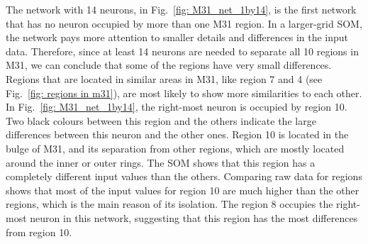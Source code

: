         
        
        The network with 14 neurons, in Fig.~\ref{fig: M31_net_1by14}, is the first network that has no neuron occupied by more than one M31 region.
        In a larger-grid SOM, the network pays more attention to smaller details and differences in the input data.
        Therefore, since at least 14 neurons are needed to separate all 10 regions in M31, we can conclude that some of the regions have very small differences.
        Regions that are located in similar areas in M31, like region 7 and 4 (see Fig.~\ref{fig: regions in m31}), are most likely to show more similarities to each other.
        In Fig.~\ref{fig: M31_net_1by14}, the right-most neuron is occupied by region 10.
        Two black colours between this region and the others indicate the large differences between this neuron and the other ones.
       Region 10 is located in the bulge of M31, and its separation from other regions, which are mostly located around the inner or outer rings.
       The SOM shows that this region has a completely different input values than the others.
       Comparing raw data for regions shows that most of the input values for region 10 are much higher than the other regions, which is the main reason of its isolation.
        The region 8 occupies the right-most neuron in this network, suggesting that this region has the most differences from region 10.
        
